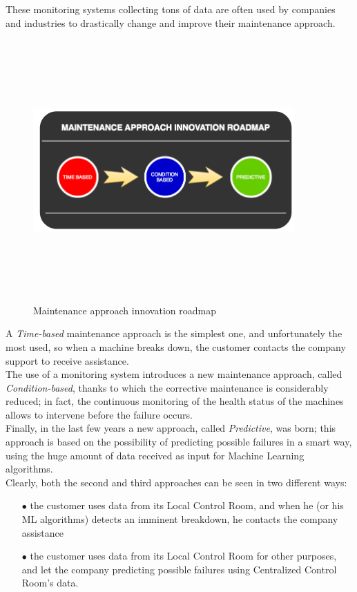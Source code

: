 \documentclass[12pt]{report}
\begin{document}
{{These monitoring systems collecting tons of data are often used by companies and industries to drastically change and improve their maintenance approach.

\begin{figure}[H]
\includegraphics[width=10cm,height=10cm,keepaspectratio]{maintenance_approach}
\centering
\caption{Maintenance approach innovation roadmap}
\end{figure}

A \emph{Time-based} maintenance approach is the simplest one, and unfortunately the most used, so when a machine breaks down, the customer contacts the company support to receive assistance.\\
The use of a monitoring system introduces a new maintenance approach, called \emph{Condition-based}, thanks to which the corrective maintenance is considerably reduced; in fact, the continuous monitoring of the health status of the machines allows to intervene before the failure occurs.\\
Finally, in the last few years a new approach, called \emph{Predictive}, was born; this approach is based on the possibility of predicting possible failures in a smart way, using the huge amount of data received as input for Machine Learning algorithms.\\

Clearly, both the second and third approaches can be seen in two different ways:

\begin{itemize}
\setlength{\itemindent}{+4mm}
\item[$\bullet$] the customer uses data from its Local Control Room, and when he (or his ML algorithms) detects an imminent breakdown, he contacts the company assistance
\item[$\bullet$] the customer uses data from its Local Control Room for other purposes, and let the company predicting possible failures using Centralized Control Room's data.\\
\end{itemize}

}}
\end{document}
